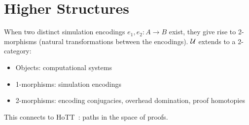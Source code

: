 \chapter{Higher Structures}\label{ch:higher}

\begin{definition}\label{sim-conjugacy}
\notready
{}
When two distinct simulation encodings $e_1, e_2 : A \to B$ exist, they
give rise to 2-morphisms (natural transformations between the encodings).
$\mathcal{U}$ extends to a 2-category:
\begin{itemize}
\item Objects: computational systems
\item 1-morphisms: simulation encodings
\item 2-morphisms: encoding conjugacies, overhead domination, proof homotopies
\end{itemize}
This connects to HoTT~\cite{hottbook}: paths in the space of proofs.
\end{definition}
